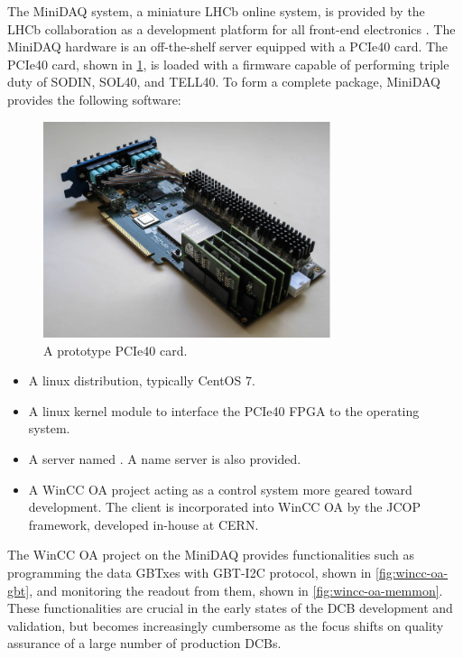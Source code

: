 The MiniDAQ system,
a miniature LHCb online system,
is provided by the LHCb collaboration as a development
platform for all front-end electronics \cite{GranadoCardoso:2702137}.
The MiniDAQ hardware is an off-the-shelf server equipped with a PCIe40 card.
The PCIe40 card, shown in \cref{fig:pcie40}, is loaded with a firmware capable
of performing triple duty of SODIN, SOL40, and TELL40.
To form a complete package, MiniDAQ provides the following software:

\begin{figure}[!htb]
    \centering
    \includegraphics[width=0.75\textwidth]{./figs-ut-upgrade/online/pcie40.pdf}
    \caption{
        A prototype PCIe40 card.
    }
    \label{fig:pcie40}
\end{figure}

\begin{itemize}
    \item A linux distribution, typically CentOS 7.
    \item A linux kernel module to interface the PCIe40 FPGA to the operating
        system.
    \item A \dim server named . A \dim name server is also
        provided.
    \item A WinCC OA project acting as a control system more geared toward
        development.
        The \dim client is incorporated into WinCC OA by the JCOP framework,
        developed in-house at CERN.
\end{itemize}

The WinCC OA project on the MiniDAQ provides functionalities such as programming
the data GBTxes with GBT-I2C protocol,
shown in \cref{fig:wincc-oa-gbt},
and monitoring the readout from them,
shown in \cref{fig:wincc-oa-memmon}.
These functionalities are crucial in the early states of the DCB development and
validation,
but becomes increasingly cumbersome as the focus shifts on quality assurance
of a large number of production DCBs.

